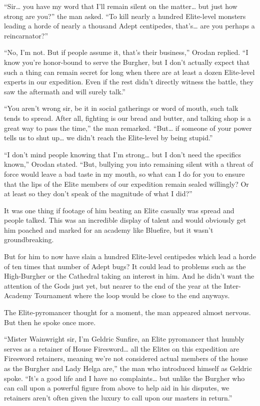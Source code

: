 \documentclass[a4paper,10pt]{book}
\begin{document}
“Sir… you have my word that I’ll remain silent on the matter… but just how strong are you?” the man asked. “To kill nearly a hundred Elite-level monsters leading a horde of nearly a thousand Adept centipedes, that’s… are you perhaps a reincarnator?”\par
“No, I’m not. But if people assume it, that’s their business,” Orodan replied. “I know you’re honor-bound to serve the Burgher, but I don’t actually expect that such a thing can remain secret for long when there are at least a dozen Elite-level experts in our expedition. Even if the rest didn’t directly witness the battle, they saw the aftermath and will surely talk.”\par
“You aren’t wrong sir, be it in social gatherings or word of mouth, such talk tends to spread. After all, fighting is our bread and butter, and talking shop is a great way to pass the time,” the man remarked. “But… if someone of your power tells us to shut up… we didn’t reach the Elite-level by being stupid.”\par
“I don’t mind people knowing that I’m strong… but I don’t need the specifics known,” Orodan stated. “But, bullying you into remaining silent with a threat of force would leave a bad taste in my mouth, so what can I do for you to ensure that the lips of the Elite members of our expedition remain sealed willingly? Or at least so they don't speak of the magnitude of what I did?”\par
It was one thing if footage of him beating an Elite casually was spread and people talked. This was an incredible display of talent and would obviously get him poached and marked for an academy like Bluefire, but it wasn’t groundbreaking.\par
But for him to now have slain a hundred Elite-level centipedes which lead a horde of ten times that number of Adept bugs? It could lead to problems such as the High-Burgher or the Cathedral taking an interest in him. And he didn’t want the attention of the Gods just yet, but nearer to the end of the year at the Inter-Academy Tournament where the loop would be close to the end anyways.\par
The Elite-pyromancer thought for a moment, the man appeared almost nervous. But then he spoke once more.\par
“Mister Wainwright sir, I’m Geldric Sunfire, an Elite pyromancer that humbly serves as a retainer of House Firesword… all the Elites on this expedition are Firesword retainers, meaning we’re not considered actual members of the house as the Burgher and Lady Helga are,” the man who introduced himself as Geldric spoke. “It’s a good life and I have no complaints… but unlike the Burgher who can call upon a powerful figure from above to help aid in his disputes, we retainers aren’t often given the luxury to call upon our masters in return.”\par
\end{document}
